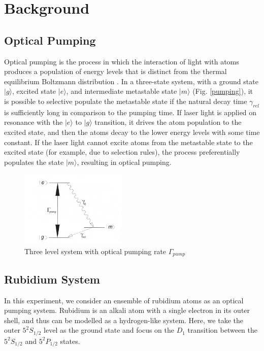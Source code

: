 
\section{Background}\label{background}

\subsection{Optical Pumping}

Optical pumping is the process in which the interaction of light with
atoms produces a population of energy levels that is distinct from the
thermal equilibrium Boltzmann distribution \cite{bernheim}. In a
three-state system, with a ground state $|g\rangle$, excited state
$|e\rangle$, and intermediate metastable state $|m\rangle$
(Fig. \ref{pumping}), it is possible to selective populate the metastable
state if the natural decay time $\gamma_{rel}$ is sufficiently long in
comparison to the pumping time. If laser light is applied on resonance
with the $|e\rangle$ to $|g\rangle$ transition, it drives the atom
population to the excited state, and then the atoms decay to the lower
energy levels with some time constant. If the laser light cannot
excite atoms from the metastable state to the excited state (for
example, due to selection rules), the process preferentially populates
the state $|m\rangle$, resulting in optical pumping.


\begin{figure}[h]
\begin{center}
\includegraphics[width=2in]{figures/pumping.eps}
\caption{\small{Three level system with optical pumping rate $\Gamma_{pump}$}}
\label{fig:pumping}
\end{center}
\end{figure}


\subsection{Rubidium System}

In this experiment, we consider an ensemble of rubidium atoms as an
optical pumping system. Rubidium is an alkali atom with a single
electron in its outer shell, and thus can be modelled as a
hydrogen-like system. Here, we take the outer $5^2S_{1/2}$ level as
the ground state and focus on the $D_1$ transition between the
$5^2S_{1/2}$ and $5^2P_{1/2}$ states. 

